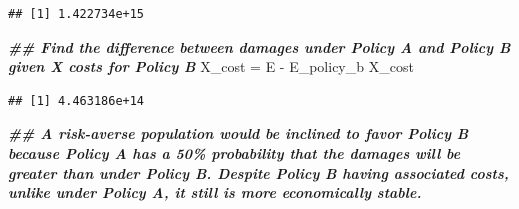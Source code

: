 \documentclass[
]{article}
\newenvironment{Shaded}{\begin{snugshade}}{\end{snugshade}}
\newcommand{\DocumentationTok}[1]{\textcolor[rgb]{0.56,0.35,0.01}{\textbf{\textit{#1}}}}
\newcommand{\NormalTok}[1]{#1}
\newcommand{\OtherTok}[1]{\textcolor[rgb]{0.56,0.35,0.01}{#1}}
\newcommand{\SpecialCharTok}[1]{\textcolor[rgb]{0.00,0.00,0.00}{#1}}
\begin{document}
\begin{verbatim}
## [1] 1.422734e+15
\end{verbatim}

\begin{Shaded}
\begin{Highlighting}[]
\DocumentationTok{\#\# Find the difference between damages under Policy A and Policy B given X costs for Policy B}
\NormalTok{X\_cost }\OtherTok{=}\NormalTok{ E }\SpecialCharTok{{-}}\NormalTok{ E\_policy\_b}
\NormalTok{X\_cost}
\end{Highlighting}
\end{Shaded}

\begin{verbatim}
## [1] 4.463186e+14
\end{verbatim}

\begin{Shaded}
\begin{Highlighting}[]
\DocumentationTok{\#\# A risk{-}averse population would be inclined to favor Policy B because Policy A has a 50\% probability that the damages will be greater than under Policy B. Despite Policy B having associated costs, unlike under Policy A, it still is more economically stable.}
\end{Highlighting}
\end{Shaded}
\end{document}
